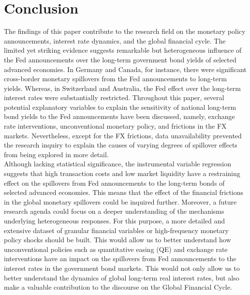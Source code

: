 \section{Conclusion}

The findings of this paper contribute to the research field on the monetary policy announcements, interest rate dynamics, and the global financial cycle. The limited yet striking evidence suggests remarkable but heterogeneous influence of the Fed announcements over the long-term government bond yields of selected advanced economies. In Germany and Canada, for instance, there were significant cross-border monetary spillovers from the Fed announcements to long-term yields. Whereas, in Switzerland and Australia, the Fed effect over the long-term interest rates were substantially restricted. Throughout this paper, several potential explanatory variables to explain the sensitivity of national long-term bond yields to the Fed announcements have been discussed, namely, exchange rate interventions, unconventional monetary policy, and frictions in the FX markets. Nevertheless, except for the FX frictions, data unavailability prevented the research inquiry to explain the causes of varying degrees of spillover effects from being explored in more detail. \\

Although lacking statistical significance, the instrumental variable regression suggests that high transaction costs and low market liquidity have a restraining effect on the spillovers from Fed announcements to the long-term bonds of selected advanced economies. This means that the effect of the financial frictions in the global monetary spillovers could be inquired further. Moreover, a future research agenda could focus on a deeper understanding of the mechanisms underlying heterogeneous responses. For this purpose, a more detailed and extensive dataset of granular financial variables or high-frequency monetary policy shocks should be built. This would allow us to better understand how unconventional policies such as quantitative easing (QE) and exchange rate interventions have an impact on the spillovers from Fed announcements to the interest rates in the government bond markets. This would not only allow us to better understand the dynamics of global long-term real interest rates, but also make a valuable contribution to the discourse on the Global Financial Cycle.